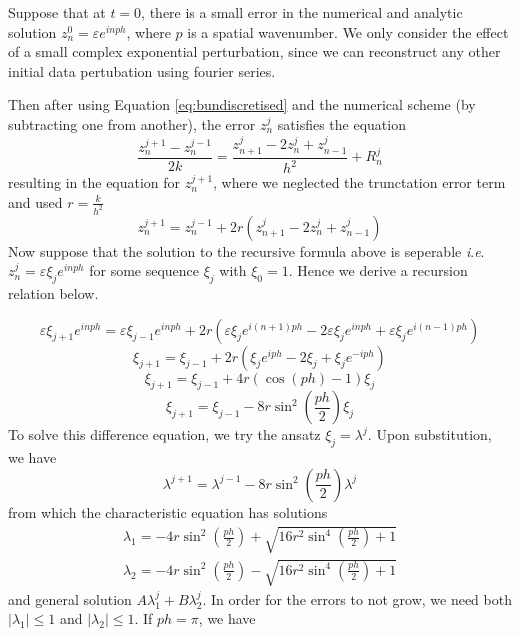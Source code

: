 \documentclass{article}
\numberwithin{equation}{section}
\theoremstyle{definition}
\newcommand{\ie}{\textit{i}.\textit{e}. }
\newcommand{\eps}{\varepsilon}
\begin{document}
Suppose that at $t=0$, there is a small error in the numerical and analytic solution $z_n^0 = \eps e^{inph}$, where $p$ is a spatial wavenumber. We only consider the effect of a small complex exponential perturbation, since we can reconstruct any other initial data pertubation using fourier series.

Then after using Equation \eqref{eq:bundiscretised} and the numerical scheme (by subtracting one from another), the error $z_n^j$ satisfies the equation
\begin{equation}
    \frac{z_n^{j+1} - z_n^{j-1}}{2k} = \frac{z_{n+1}^j - 2z_n^j + z_{n-1}^j}{h^2} + R_n^j
\end{equation}
resulting in the equation for $z_n^{j+1}$, where we neglected the trunctation error term and used $r = \frac{k}{h^2}$
\begin{equation}
    z_n^{j+1} = z_n^{j-1} + 2r(z_{n+1}^j - 2z_n^j + z_{n-1}^j)
\end{equation}
Now suppose that the solution to the recursive formula above is seperable \ie $z_n^j = \eps \xi_j e^{inph}$ for some sequence $\xi_j$ with $\xi_0 = 1$. Hence we derive a recursion relation below.

\begin{equation}
    \eps \xi_{j+1} e^{inph} = \eps \xi_{j-1} e^{inph} + 2r(\eps \xi_j e^{i(n+1)ph} - 2\eps \xi_j e^{inph} + \eps \xi_j e^{i(n-1)ph})
\end{equation}
\begin{equation}
     \xi_{j+1}  =  \xi_{j-1}  + 2r( \xi_j e^{iph} - 2 \xi_j  + \xi_j e^{-iph})
\end{equation}
\begin{equation}
    \xi_{j+1}  =  \xi_{j-1} + 4r (\cos(ph) - 1) \xi_j
\end{equation}
\begin{equation}
    \xi_{j+1}  =  \xi_{j-1} -8r\sin^2\left(\frac{ph}{2}\right) \xi_j
\end{equation}
To solve this difference equation, we try the ansatz $ \xi_j = \lambda^j$. Upon substitution, we have
\begin{equation}
    \lambda^{j+1}=\lambda^{j-1}-8r\sin^{2}\left(\frac{ph}{2}\right)\lambda^{j}
\end{equation}
from which the characteristic equation has solutions
\begin{align}
    \lambda_1 = -4r\sin^{2}\left(\frac{ph}{2}\right) + \sqrt{16r^{2}\sin^{4}\left(\frac{ph}{2}\right)+1} \\
    \lambda_2 = -4r\sin^{2}\left(\frac{ph}{2}\right) - \sqrt{16r^{2}\sin^{4}\left(\frac{ph}{2}\right)+1}
\end{align}
and general solution $A \lambda_1^j + B \lambda_2^j$. In order for the errors to not grow, we need both $|\lambda_1| \leq 1$ and $|\lambda_2| \leq 1$.
If $ph = \pi$, we have
\end{document}
